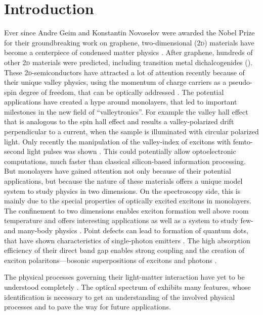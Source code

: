 \chapter{Introduction}
Ever since Andre Geim and Konstantin Novoselov were awarded the Nobel Prize for their groundbreaking work on graphene, two-dimensional (2\textsc{d}) materials have become a centerpiece of condensed matter physics \cite{novoselov_electric_2004}. After graphene, hundreds of other 2\textsc{d} materials were predicted, including transition metal dichalcogenides (\tmds\!). These 2\textsc{d}-semiconductors have attracted a lot of attention recently because of their unique valley physics, using the momentum of charge carriers as a pseudo-spin degree of freedom, that can be optically addressed \cite{wang_electronics_2012}. The potential applications have created a hype around \tmdg monolayers, that led to important milestones in the new field of ``valleytronics''. For example the valley hall effect \cite{mak_valley_2014} that is analogous to the spin hall effect and results a valley-polarized drift perpendicular to a current, when the sample is illuminated with circular polarized light. Only recently the manipulation of the valley-index of excitons with femto-second light pulses was shown \cite{langer_lightwave_2018}. This could potentially allow optoelectronic computations, much faster than classical silicon-based information processing. But \tmdg monolayers have gained attention not only because of their potential applications, but because the nature of these materials offers a unique model system to study physics in two dimensions. On the spectroscopy side, this is mainly due to the special properties of optically excited excitons in \tmdg monolayers. The confinement to two dimensions enables exciton formation well above room temperature and offers interesting applications as well as a system to study few- and many-body physics \cite{chernikov_exciton_2014}. Point defects can lead to formation of quantum dots, that have shown characteristics of single-photon emitters \cite{srivastava_optically_2015}. The high absorption efficiency of their direct band gap enables strong coupling and the creation of exciton polaritons---bosonic superpositions of excitons and photons \cite{liu_control_2017,zhang_photonic-crystal_2018}.

The physical processes governing their light-matter interaction have yet to be understood completely \cite{koperski_optical_2017}. The optical spectrum of \tmds exhibits many features, whose identification is necessary to get an understanding of the involved physical processes and to pave the way for future applications. 

